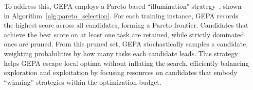 
To address this, GEPA employs a Pareto-based ``illumination" strategy~\citep{map_elites}, shown in Algorithm~\ref{alg:pareto_selection}. For each training instance, GEPA records the highest score across all candidates, forming a Pareto frontier. Candidates that achieve the best score on at least one task are retained, while strictly dominated ones are pruned.
From this pruned set, GEPA stochastically samples a candidate, weighting probabilities by how many tasks each candidate leads. This strategy helps GEPA escape local optima without inflating the search, efficiently balancing exploration and exploitation by focusing resources on candidates that embody ``winning'' strategies within the optimization budget.



